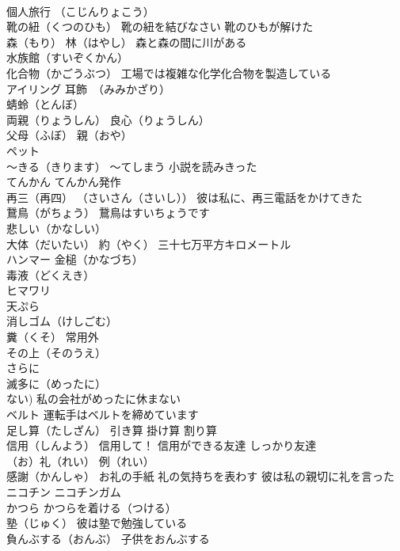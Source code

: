 \documentclass[8pt]{extreport}
\begin{document}
\begin{CJK}{UTF8}{min}
\\	個人旅行 （こじんりょこう）
\\	靴の紐（くつのひも） 靴の紐を結びなさい 靴のひもが解けた
\\	森（もり） 林（はやし） 森と森の間に川がある
\\	水族館（すいぞくかん）
\\	化合物（かごうぶつ） 工場では複雑な化学化合物を製造している
\\	アイリング 耳飾　（みみかざり）
\\	蜻蛉（とんぼ）
\\	両親（りょうしん） 良心（りょうしん）
\\	父母（ふぼ） 親（おや）
\\	ペット
\\	～きる（きります） ～てしまう 小説を読みきった
\\	てんかん てんかん発作
\\	再三（再四） （さいさん（さいし）） 彼は私に、再三電話をかけてきた
\\	鵞鳥（がちょう） 鵞鳥はすいちょうです
\\	悲しい（かなしい）
\\	大体（だいたい） 約（やく） 三十七万平方キロメートル
\\	ハンマー 金槌（かなづち）
\\	毒液（どくえき）
\\	ヒマワリ
\\	天ぷら
\\	消しゴム（けしごむ）
\\	糞（くそ） 常用外
\\	その上（そのうえ）
\\	さらに 
\\	滅多に（めったに）
\\	ない) 私の会社がめったに休まない
\\	ベルト 運転手はベルトを締めています
\\	足し算（たしざん） 引き算 掛け算 割り算
\\	信用（しんよう） 信用して！ 信用ができる友達 しっかり友達
\\	（お）礼（れい） 例（れい） 
\\	感謝（かんしゃ） お礼の手紙 礼の気持ちを表わす 彼は私の親切に礼を言った
\\	ニコチン ニコチンガム
\\	かつら かつらを着ける（つける）
\\	塾（じゅく） 彼は塾で勉強している
\\	負んぶする（おんぶ） 子供をおんぶする

\end{CJK}
\end{document}
